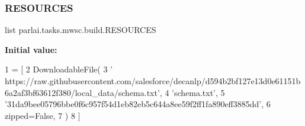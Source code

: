 \subsubsection{\texorpdfstring{R\+E\+S\+O\+U\+R\+C\+ES}{RESOURCES}}
{\footnotesize\ttfamily list parlai.\+tasks.\+mwsc.\+build.\+R\+E\+S\+O\+U\+R\+C\+ES}

{\bfseries Initial value\+:}
\begin{DoxyCode}
1 =  [
2     DownloadableFile(
3         \textcolor{stringliteral}{'
      https://raw.githubusercontent.com/salesforce/decanlp/d594b2bf127e13d0e61151b6a2af3bf63612f380/local\_data/schema.txt'},
4         \textcolor{stringliteral}{'schema.txt'},
5         \textcolor{stringliteral}{'31da9bee05796bbe0f6c957f54d1eb82eb5c644a8ee59f2ff1fa890eff3885dd'},
6         zipped=\textcolor{keyword}{False},
7     )
8 ]
\end{DoxyCode}
